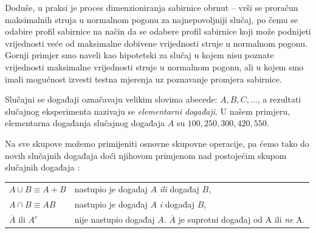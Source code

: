 \documentclass[a4paper,12pt,oneside]{memoir}
\begin{document}
            Doduše, u praksi je proces dimenzioniranja sabirnice obrnut -- vrši se proračun maksimalnih struja u normalnom pogonu za najnepovoljniji slučaj, po čemu se odabire profil sabirnice na način da se odabere profil sabirnice koji može podnijeti vrijednosti veće od maksimalne dobivene vrijednosti struje u normalnom pogonu. Gornji primjer smo naveli kao hipotetski za slučaj u kojem nisu poznate vrijednosti maksimalne vrijednosti struje u normalnom pogonu, ali u kojem smo imali mogućnost izvesti testna mjerenja uz poznavanje promjera sabirnice.

            Slučajni se događaji označavaju velikim slovima abecede: $A,B,C,\ldots$, a rezultati slučajnog eksperimenta nazivaju se \textit{elementarni događaji}. U našem primjeru, elementarna događanja slučajnog događaja $A$ su $100,250,300,420,550$.

            Na sve skupove možemo primijeniti osnovne skupovne operacije, pa ćemo tako do novih slučajnih događaja doći njihovom primjenom nad postojećim skupom slučajnih događaja \cite{Bahovec}:

            \begin{table}[H]
                \centering
                \begin{tabular*}{0.9\textwidth}{l p{13cm}}
                    \textit{$A\cup B\equiv A+B$} & nastupio je događaj $A$ \textit{ili} događaj $B$,\\
                    \textit{$A\cap B\equiv AB$} & nastupio je događaj $A$ \textit{i} događaj $B$,\\
                    \textit{$\overline{A}$} ili \textit{$A^c$} & nije nastupio događaj $A$. $\overline{A}$ je suprotni događaj od A ili \textit{ne} A.\\
                \end{tabular*}
            \end{table}
\end{document}
